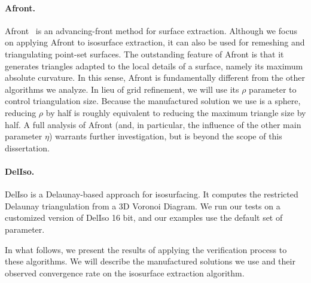 \paragraph*{Afront.} Afront~\cite{Schreiner06} is an advancing-front method
for surface extraction. Although we focus on applying Afront to
isosurface extraction, it can also be used for remeshing and
triangulating point-set surfaces. The outstanding feature of Afront is
that it generates triangles adapted to the local details of a surface,
namely its maximum absolute curvature. In this sense, Afront is
fundamentally different from the other algorithms we analyze. In lieu
of grid refinement, we will use its $\rho$ parameter to control
triangulation size. Because the manufactured solution we use is a
sphere, reducing $\rho$ by half is roughly equivalent to reducing the
maximum triangle size by half. A full analysis of Afront (and, in
particular, the influence of the other main parameter $\eta$) warrants
further investigation, but is beyond the scope of this dissertation.

\paragraph*{DelIso.} DelIso \cite{Dey07} is a Delaunay-based 
approach for isosurfacing. It computes the restricted Delaunay triangulation 
from a 3D Voronoi Diagram. We run our tests on a customized version of DelIso 16 bit, 
and our examples use the default set of parameter.


In what follows, we present the results of applying the verification process 
to these algorithms. We will describe the manufactured solutions we use and
their observed convergence rate on the isosurface extraction algorithm.


